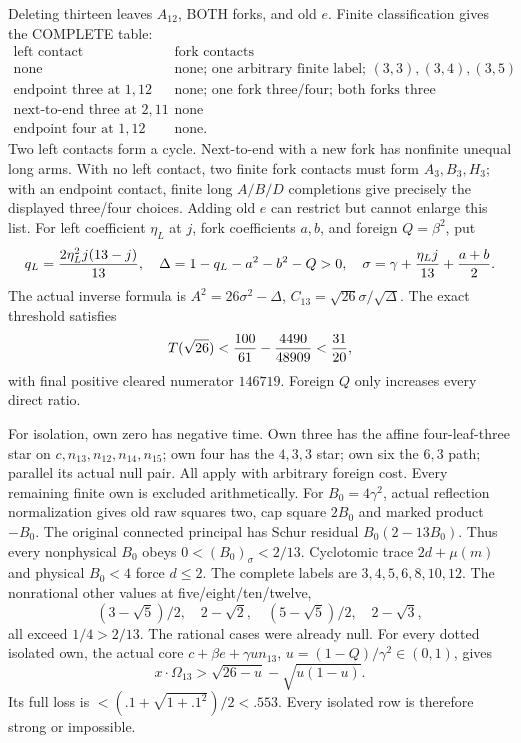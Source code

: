 Deleting thirteen leaves \(A_{12}\), BOTH forks,
and old \(e\).
Finite classification gives the COMPLETE table:
\[
\begin{array}{c|l}
 \text{left contact}&\text{fork contacts}\\ \hline
 \text{none}&
 \text{none; one arbitrary finite label; }
                 (3,3),(3,4),(3,5)\\
 \text{endpoint three at }1,12&
 \text{none; one fork three/four; both forks three}\\
 \text{next-to-end three at }2,11&\text{none}\\
 \text{endpoint four at }1,12&\text{none}.
\end{array}
\]
Two left contacts form a cycle.
Next-to-end with a new fork has nonfinite unequal
long arms.
With no left contact, two finite fork contacts must
form \(A_3,B_3,H_3\); with an endpoint contact,
finite long \(A/B/D\) completions give precisely the
displayed three/four choices.
Adding old \(e\) can restrict but cannot enlarge this list.
For left coefficient \(\eta_L\) at \(j\), fork
coefficients \(a,b\), and foreign \(Q=\beta^2\), put
\[
 q_L={2\eta_L^2j(13-j)\over13},\quad
 \Delta=1-q_L-a^2-b^2-Q>0,\quad
 \sigma=\gamma+{\eta_Lj\over13}+{a+b\over2}.
\]
The actual inverse formula is
\(A^2=26\sigma^2-\Delta\),
\(C_{13}=\sqrt{26}\sigma/\sqrt\Delta\).
The exact threshold satisfies
\[
 T(\sqrt{26})<{100\over61}-{4490\over48909}<{31\over20},
\]
with final positive cleared numerator \(146719\).
Foreign \(Q\) only increases every direct ratio.

For isolation, own zero has negative time.
Own three has the affine four-leaf-three star on
\(c,n_{13},n_{12},n_{14},n_{15}\);
own four has the \(4,3,3\) star; own six the \(6,3\)
path; parallel its actual null pair.
All apply with arbitrary foreign cost.
Every remaining finite own is excluded arithmetically.
For \(B_0=4\gamma^2\), actual reflection normalization
gives old raw squares two, cap square \(2B_0\) and
marked product \(-B_0\).
The original connected principal has Schur residual
\(B_0(2-13B_0)\).
Thus every nonphysical \(B_0\) obeys
\(0<(B_0)_\sigma<2/13\).
Cyclotomic trace \(2d+\mu(m)\) and physical \(B_0<4\)
force \(d\le2\).
The complete labels are \(3,4,5,6,8,10,12\).
The nonrational other values at five/eight/ten/twelve,
\[
 (3-\sqrt5)/2,\quad2-\sqrt2,\quad
 (5-\sqrt5)/2,\quad2-\sqrt3,
\]
all exceed \(1/4>2/13\).
The rational cases were already null.
For every dotted isolated own, the actual core
\(c+\beta e+\gamma u n_{13}\),
\(u=(1-Q)/\gamma^2\in(0,1)\), gives
\[
 x\cdot\Omega_{13}>
           \sqrt{26-u}-\sqrt{u(1-u)}.
\]
Its full loss is \(<(.1+\sqrt{1+.1^2})/2<.553\).
Every isolated row is therefore strong or impossible.

